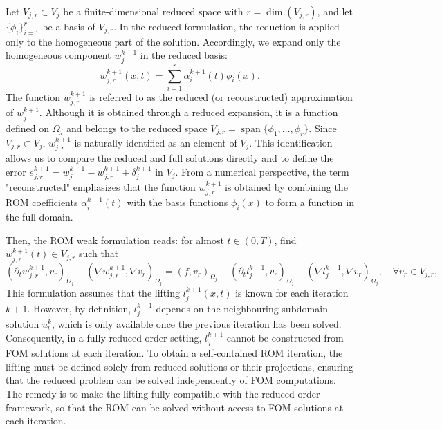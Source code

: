 \documentclass[a4paper, 11pt]{article}
\theoremstyle{remark}
\begin{document}
\noindent Let $V_{j, r}\subset V_{j}$ be a finite-dimensional reduced space with $r = \dim(V_{j, r})$, and let $\{\phi_{i}\}_{i=1}^{r}$ be a basis of $V_{j, r}$. In the reduced formulation, the reduction is applied only to the homogeneous part of the solution. Accordingly, we expand only the homogeneous component $w^{k+1}_{j}$ in the reduced basis:
\begin{equation*}
    w^{k+1}_{j, r}(x, t) = \sum_{i=1}^{r}\alpha^{k+1}_{i}(t)\phi_{i}(x).
\end{equation*}
The function $w^{k+1}_{j,r}$ is referred to as the reduced (or reconstructed) approximation of $w_{j}^{k+1}$. Although it is obtained through a reduced expansion, it is a function defined on $\Omega_j$ and belongs to the reduced space $V_{j,r}=\operatorname{span}\{\phi_1,\dots,\phi_r\}$. Since $V_{j,r}\subset V_j$, $w^{k+1}_{j,r}$ is naturally identified as an element of $V_j$. This identification allows us to compare the reduced and full solutions directly and to define the error $e_{j,r}^{k+1}=w_{j}^{k+1}-w_{j,r}^{k+1} + \delta_{j}^{k+1}$ in $V_j$. From a numerical perspective, the term "reconstructed" emphasizes that the function $w^{k+1}_{j,r}$ is obtained by combining the ROM coefficients $\alpha^{k+1}_i(t)$ with the basis functions $\phi_i(x)$ to form a function in the full domain. 

\vspace{10pt}
\noindent Then, the ROM weak formulation reads: for almost $t \in (0,T)$, find $w_{j, r}^{k+1}(t) \in V_{j, r}$ such that
\begin{equation*}
    \left(\partial_{t} w_{j, r}^{k+1}, v_{r}\right)_{\Omega_{j}} + \left(\nabla w_{j, r}^{k+1}, \nabla v_{r}\right)_{\Omega_{j}} = \left(f, v_{r}\right)_{\Omega_{j}} - \left(\partial_{t} l_{j}^{k+1}, v_{r}\right)_{\Omega_{j}} - \left(\nabla l_{j}^{k+1}, \nabla v_{r}\right)_{\Omega_{j}}, \quad\forall v_{r}\in V_{j, r},
\end{equation*}
This formulation assumes that the lifting $l_j^{k+1}(x,t)$ is known for each iteration $k+1$. However, by definition, $l_j^{k+1}$ depends on the neighbouring subdomain solution $u_l^k$, which is only available once the previous iteration has been solved. Consequently, in a fully reduced-order setting, $l_j^{k+1}$ cannot be constructed from FOM solutions at each iteration. To obtain a self-contained ROM iteration, the lifting must be defined solely from reduced solutions or their projections, ensuring that the reduced problem can be solved independently of FOM computations. The remedy is to make the lifting fully compatible with the reduced-order framework, so that the ROM can be solved without access to FOM solutions at each iteration. 
\end{document}
